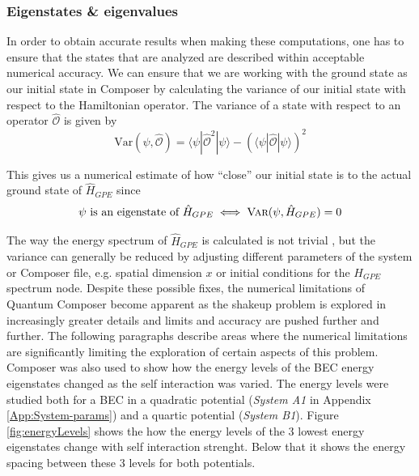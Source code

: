 \documentclass[a4paper, twocolumn]{revtex4-1}
\begin{document}
\subsubsection{Eigenstates \& eigenvalues}

In order to obtain accurate results when making these computations, one has to ensure that the states that are analyzed are described within acceptable numerical accuracy. We can ensure that we are working with the ground state as our initial state in Composer by calculating the variance of our initial state with respect to the Hamiltonian operator. The variance of a state with respect to an operator $\hat{\mathcal{O}}$ is given by
\begin{equation}
	\text{Var}(\psi, \hat{\mathcal{O}}) = \langle \psi | \hat{\mathcal{O}}^2 | \psi \rangle - \left(\langle \psi | \hat{\mathcal{O}} | \psi \rangle\right)^2
\end{equation}

This gives us a numerical estimate of how ``close'' our initial state is to the actual ground state of $\hat{H}_{GPE}$ since
\begin{equation}
	\psi \text{ is an eigenstate of } \hat{H}_{GPE} \iff \textsc{Var}(\psi, \hat{H}_{GPE}) = 0
\end{equation}

The way the energy spectrum of $\hat{H}_{GPE}$ is calculated is not trivial \cite{QEngine}, but the variance can generally be reduced by adjusting different parameters of the system or Composer file, e.g. spatial dimension $x$ or initial conditions for the $H_{GPE}$ spectrum node. Despite these possible fixes, the numerical limitations of Quantum Composer become apparent as the shakeup problem is explored in increasingly greater details and limits and accuracy are pushed further and further. The following paragraphs describe areas where the numerical limitations are significantly limiting the exploration of certain aspects of this problem.\\

Composer was also used to show how the energy levels of the BEC energy eigenstates changed as the self interaction was varied. The energy levels were studied both for a BEC in a quadratic potential (\textit{System A1} in Appendix \ref{App:System-params}) and a quartic potential (\textit{System B1}). Figure \ref{fig:energyLevels} shows the how the energy levels of the 3 lowest energy eigenstates change with self interaction strenght. Below that it shows the energy spacing between these 3 levels for both potentials. 
\end{document}
